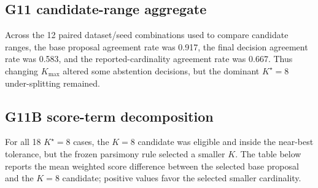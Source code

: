 \subsection{G11 candidate-range aggregate}
\begin{table}[H]
\centering
\caption{Full GuardK v0.4 candidate-range aggregate at $n=2000$ (three seeds per row).}
\scriptsize
{}
\end{table}

Across the 12 paired dataset/seed combinations used to compare candidate ranges, the base proposal agreement rate was 0.917, the final decision agreement rate was 0.583, and the reported-cardinality agreement rate was 0.667. Thus changing $K_{\max}$ altered some abstention decisions, but the dominant $K^\star=8$ under-splitting remained.

\subsection{G11B score-term decomposition}
For all 18 $K^\star=8$ cases, the $K=8$ candidate was eligible and inside the near-best tolerance, but the frozen parsimony rule selected a smaller $K$. The table below reports the mean weighted score difference between the selected base proposal and the $K=8$ candidate; positive values favor the selected smaller cardinality.

